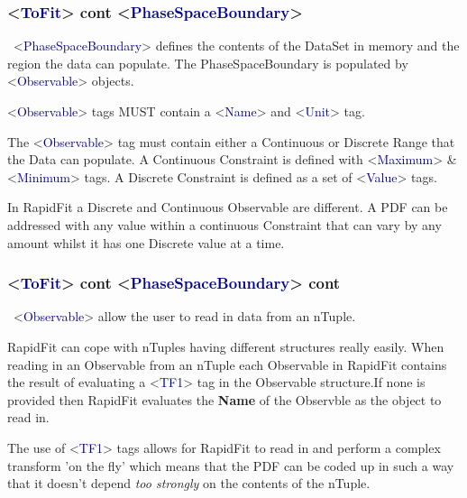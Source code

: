 \documentclass{beamer}
\begin{document}
\begin{frame}
\frametitle{<\textcolor{darkblue}{ToFit}> cont <\textcolor{darkblue}{PhaseSpaceBoundary}>}
\scriptsize~<\textcolor{darkblue}{PhaseSpaceBoundary}> defines the contents of the DataSet in memory and the region the data can populate.\newline\newline
The PhaseSpaceBoundary is populated by <\textcolor{darkblue}{Observable}> objects.\newline

<\textcolor{darkblue}{Observable}> tags MUST contain a <\textcolor{darkblue}{Name}> and <\textcolor{darkblue}{Unit}> tag.\newline\newline

The <\textcolor{darkblue}{Observable}> tag must contain either a Continuous or Discrete Range that the Data can populate.\newline
A Continuous Constraint is defined with <\textcolor{darkblue}{Maximum}> \& <\textcolor{darkblue}{Minimum}> tags.\newline
A Discrete Constraint is defined as a set of <\textcolor{darkblue}{Value}> tags.\newline\newline

In RapidFit a Discrete and Continuous Observable are different. A PDF can be addressed with any value within a continuous Constraint that can vary by any amount whilst it has one Discrete value at a time.
\end{frame}

\begin{frame}
\frametitle{<\textcolor{darkblue}{ToFit}> cont <\textcolor{darkblue}{PhaseSpaceBoundary}> cont}
\scriptsize~<\textcolor{darkblue}{Observable}> allow the user to read in data from an nTuple.\newline\newline

RapidFit can cope with nTuples having different structures really easily.\newline\newline
When reading in an Observable from an nTuple each Observable in RapidFit contains the result of evaluating a <\textcolor{darkblue}{TF1}> tag in the Observable structure.\newline If none is provided then RapidFit evaluates the \textbf{Name} of the Observble as the object to read in.\newline

The use of <\textcolor{darkblue}{TF1}> tags allows for RapidFit to read in and perform a complex transform 'on the fly' which means that the PDF can be coded up in such a way that it doesn't depend \textit{too strongly} on the contents of the nTuple.\newline\newline

\end{frame}
\end{document}
